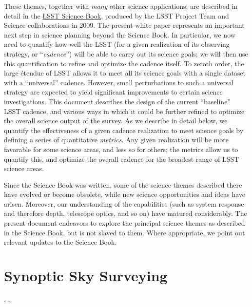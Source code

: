 These themes, together with {\em many} other science applications, are
described in detail in the
\href{http://lsst.org/scientists/scibook}{LSST Science Book}, produced
by the LSST Project Team and Science collaborations in 2009.  The
present white paper represents an important next step in science
planning beyond the Science Book.  In particular, we now need to
quantify how well the LSST (for a given realization of its observing
strategy, or ``{\em cadence}'') will be able to carry out its science
goals; we will then use this quantification to refine and optimize
the cadence itself.  To zeroth order, the large \'etendue of LSST
allows it to meet all its science goals with a single dataset with a
``universal'' cadence.  However, small perturbations to such a universal strategy are expected to yield significant improvements to certain science investigations. This document describes the design of the current ``baseline'' LSST
cadence, and various ways in which it could be further refined to
optimize the overall science output of the survey.  As we describe in detail
below, we quantify the effectiveness of a given cadence realization to
meet science goals by defining a series of quantitative {\em metrics}.
Any given realization will be more favorable for some science areas,
and less so for others; the metrics allow us to quantify this, and
optimize the overall cadence for the broadest range of LSST science
areas.

Since the Science Book was written, some of the
science themes described there have evolved or become obsolete,
while new science opportunities and ideas have arisen.  Moreover, our
understanding of the capabilities (such as system response and
therefore depth, telescope optics, and so on) have matured
considerably.  The present document endeavors to explore the principal
science themes as described in the Science Book, but is not slaved to
them. Where appropriate, we point out relevant updates to the
Science Book.




\section{Synoptic Sky Surveying}
\def\secname{intro:baseline}\label{sec:\secname}

,
,


